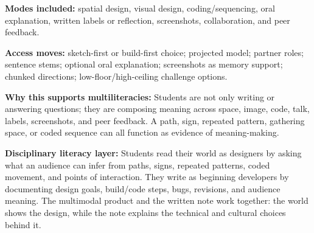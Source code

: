 \textbf{Modes included:} spatial design, visual design, coding/sequencing, oral explanation, written labels or reflection, screenshots, collaboration, and peer feedback.

\textbf{Access moves:} sketch-first or build-first choice; projected model; partner roles; sentence stems; optional oral explanation; screenshots as memory support; chunked directions; low-floor/high-ceiling challenge options.

\textbf{Why this supports multiliteracies:} Students are not only writing or answering questions; they are composing meaning across space, image, code, talk, labels, screenshots, and peer feedback. A path, sign, repeated pattern, gathering space, or coded sequence can all function as evidence of meaning-making.

\textcolor{LessonTwoAccent}{\textbf{Disciplinary literacy layer:} Students read their world as designers by asking what an audience can infer from paths, signs, repeated patterns, coded movement, and points of interaction. They write as beginning developers by documenting design goals, build/code steps, bugs, revisions, and audience meaning. The multimodal product and the written note work together: the world shows the design, while the note explains the technical and cultural choices behind it.}
